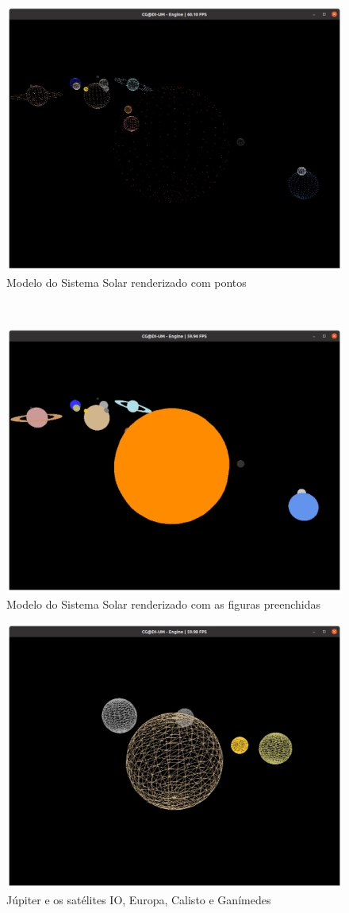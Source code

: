 \documentclass[a4paper, 11pt]{article}
\begin{document}
\begin{figure}[H]
    \centering
    \includegraphics[width=.7\textwidth]{img/solarp.png}
    \caption{Modelo do Sistema Solar renderizado com pontos}
\end{figure}

\

\begin{figure}[H]
    \centering
    \includegraphics[width=.7\textwidth]{img/solarf.png}
    \caption{Modelo do Sistema Solar renderizado com as figuras preenchidas}
\end{figure}

\begin{figure}[H]
    \centering
    \includegraphics[width=.7\textwidth]{img/jupiter.png}
    \caption{Júpiter e os satélites IO, Europa, Calisto e Ganímedes}
\end{figure}
\end{document}
